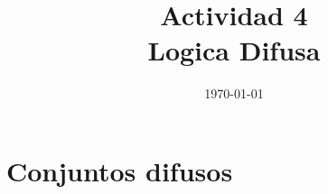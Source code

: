 \documentclass[12pt,a4paper,spanish]{article}
\title{Actividad 4 \\ Logica Difusa} %
\date{\today} %
\begin{document}
\maketitle %




\clearpage
\section{Conjuntos difusos}
\end{document}
